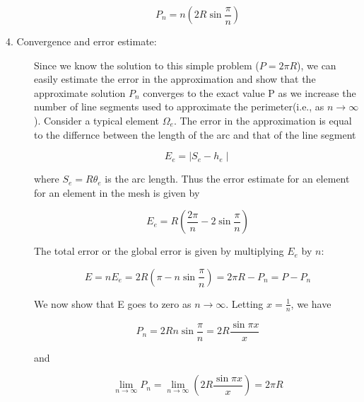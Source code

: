 \documentclass{report}
\numberwithin{equation}{chapter}
\begin{document}
\begin{spacing}{1.5}
\begin{description}
     \begin{center}
        \begin{equation}
        	P_{n} = n\left(2R\sin\frac{\pi}{n} \right)
        \end{equation}
     \end{center}
  \item[4. Convergence and error estimate:] Since we know the solution to this simple problem ($P = 2\pi R$), we can easily estimate the error in the approximation and show that the approximate solution $P_{n}$ converges to the exact value P as we increase the number of line segments used to approximate the perimeter(i.e., as $n \rightarrow \infty $). Consider a typical element $\Omega_{e}$. The error in the approximation is equal to the differnce between the length of the arc and that of the line segment
  \begin{center}
          \begin{equation}
          	E_{e} = \mid S_{e}-h_{e} \mid
          \end{equation}
       \end{center}
  where $S_{e} = R\theta_{e}$ is the arc length. Thus the error estimate for an element for an element in the mesh is given by
  \begin{center}
            \begin{equation}
            	E_{e} = R\left(\frac{2\pi}{n}-2\sin\frac{\pi}{n}\right)
            \end{equation}
  \end{center}
  The total error or the global error is given by multiplying $E_{e}$ by $n$:
  \begin{center}
              \begin{equation}
              	E = nE_{e} = 2R\left(\pi-n\sin\frac{\pi}{n}\right) = 2\pi R-P_{n} = P-P_{n}
              \end{equation}
    \end{center}
    We now show that E goes to zero as $n \rightarrow \infty$. Letting $x = \frac{1}{n}$, we have
    \begin{center}
         \begin{equation}
         P_{n} = 2Rn\sin\frac{\pi}{n} = 2R\frac{\sin\pi x}{x}         	
         \end{equation}
    \end{center}
    and
\begin{center}
         \begin{equation}
         \lim\limits_{n\rightarrow \infty}P_{n} =  \lim\limits_{n\rightarrow \infty}(2R\frac{\sin\pi x}{x}) = 2\pi R         	
         \end{equation}
\end{center}
\end{description}
\begin{center}

\end{center}
\end{spacing}
\end{document}
